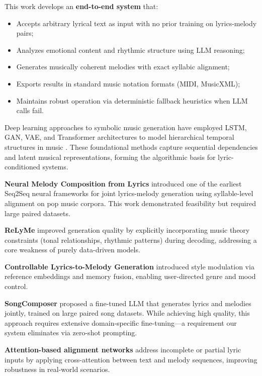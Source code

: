 \documentclass[conference]{IEEEtran}
\begin{document}
This work develops an \textbf{end-to-end system} that:
\begin{itemize}
  \item Accepts arbitrary lyrical text as input with no prior training on
        lyrics-melody pairs;
  \item Analyzes emotional content and rhythmic structure using LLM reasoning;
  \item Generates musically coherent melodies with exact syllabic alignment;
  \item Exports results in standard music notation formats (MIDI, MusicXML);
  \item Maintains robust operation via deterministic fallback heuristics when
        LLM calls fail.
\end{itemize}

Deep learning approaches to symbolic music generation have employed LSTM, GAN,
VAE, and Transformer architectures to model hierarchical temporal structures in
music \cite{briot2020}. These foundational methods capture sequential
dependencies and latent musical representations, forming the algorithmic basis
for lyric-conditioned systems.

\textbf{Neural Melody Composition from Lyrics} \cite{bao2018} introduced one
of the earliest Seq2Seq neural frameworks for joint lyrics-melody generation
using syllable-level alignment on pop music corpora. This work demonstrated
feasibility but required large paired datasets.

\textbf{ReLyMe} \cite{zhang2022relyme} improved generation quality by
explicitly incorporating music theory constraints (tonal relationships, rhythmic
patterns) during decoding, addressing a core weakness of purely data-driven
models.

\textbf{Controllable Lyrics-to-Melody Generation} \cite{zhang2023controllable}
introduced style modulation via reference embeddings and memory fusion,
enabling user-directed genre and mood control.

\textbf{SongComposer} \cite{ding2024songcomposer} proposed a fine-tuned LLM
that generates lyrics and melodies jointly, trained on large paired song
datasets. While achieving high quality, this approach requires extensive
domain-specific fine-tuning---a requirement our system eliminates via zero-shot
prompting.

\textbf{Attention-based alignment networks} \cite{reddy2023} address incomplete
or partial lyric inputs by applying cross-attention between text and melody
sequences, improving robustness in real-world scenarios.
\end{document}
